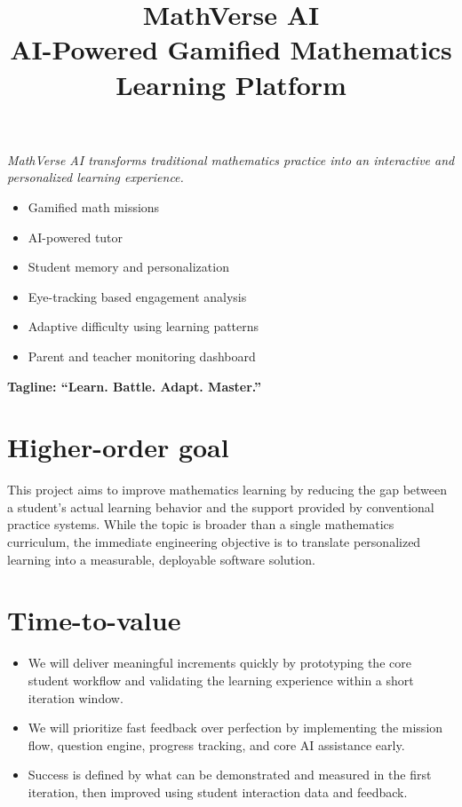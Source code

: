 \documentclass[11pt]{article}
\title{\textbf{MathVerse AI}\\[0.3em]\large AI-Powered Gamified Mathematics Learning Platform}
\author{}
\date{}
\begin{document}
\maketitle

\begin{center}
\textit{MathVerse AI transforms traditional mathematics practice into an interactive and personalized learning experience.}
\end{center}

\begin{itemize}[itemsep=2pt]
    \item Gamified math missions
    \item AI-powered tutor
    \item Student memory and personalization
    \item Eye-tracking based engagement analysis
    \item Adaptive difficulty using learning patterns
    \item Parent and teacher monitoring dashboard
\end{itemize}

\begin{center}
\textbf{Tagline: ``Learn. Battle. Adapt. Master.''}
\end{center}

\section{Higher-order goal}
This project aims to improve mathematics learning by reducing the gap between a student's actual learning behavior and the support provided by conventional practice systems. While the topic is broader than a single mathematics curriculum, the immediate engineering objective is to translate personalized learning into a measurable, deployable software solution.

\section{Time-to-value}
\begin{itemize}
    \item We will deliver meaningful increments quickly by prototyping the core student workflow and validating the learning experience within a short iteration window.
    \item We will prioritize fast feedback over perfection by implementing the mission flow, question engine, progress tracking, and core AI assistance early.
    \item Success is defined by what can be demonstrated and measured in the first iteration, then improved using student interaction data and feedback.
\end{itemize}
\end{document}
